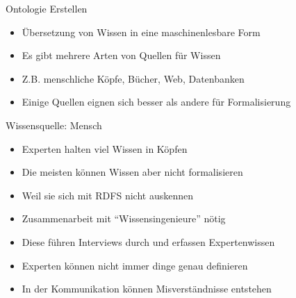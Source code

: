 \documentclass{beamer}
\begin{document}
\begin{frame}{Ontologie Erstellen}
	
	\begin{itemize}
		\item Übersetzung von Wissen in eine maschinenlesbare Form
		\item Es gibt mehrere Arten von Quellen für Wissen
		\item Z.B. menschliche Köpfe, Bücher, Web, Datenbanken
		\item Einige Quellen eignen sich besser als andere für Formalisierung
	\end{itemize}
	
\end{frame}

\begin{frame}{Wissensquelle: Mensch}
	
	\begin{itemize}
		\item Experten halten viel Wissen in Köpfen
		\item Die meisten können Wissen aber nicht formalisieren
		\item Weil sie sich mit RDFS nicht auskennen
		\item Zusammenarbeit mit ``Wissensingenieure'' nötig
		\item Diese führen Interviews durch und erfassen Expertenwissen
		\item Experten können nicht immer dinge genau definieren
		\item In der Kommunikation können Misverständnisse entstehen
	\end{itemize}
	
\end{frame}
\end{document}
